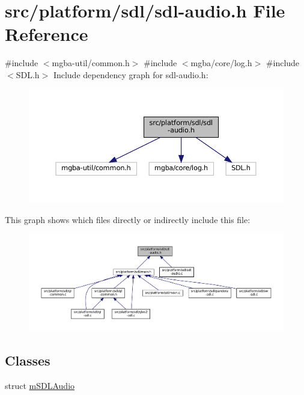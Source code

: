 \hypertarget{sdl-audio_8h}{}\section{src/platform/sdl/sdl-\/audio.h File Reference}
\label{sdl-audio_8h}
{\ttfamily \#include $<$mgba-\/util/common.\+h$>$}\newline
{\ttfamily \#include $<$mgba/core/log.\+h$>$}\newline
{\ttfamily \#include $<$S\+D\+L.\+h$>$}\newline
Include dependency graph for sdl-\/audio.h\+:
\nopagebreak
\begin{figure}[H]
\begin{center}
\leavevmode
\includegraphics[width=350pt]{sdl-audio_8h__incl}
\end{center}
\end{figure}
This graph shows which files directly or indirectly include this file\+:
\nopagebreak
\begin{figure}[H]
\begin{center}
\leavevmode
\includegraphics[width=350pt]{sdl-audio_8h__dep__incl}
\end{center}
\end{figure}
\subsection*{Classes}
\begin{DoxyCompactItemize}
\item 
struct \mbox{\hyperlink{sdl-audio_8h_structm_s_d_l_audio}{m\+S\+D\+L\+Audio}}
\end{DoxyCompactItemize}
